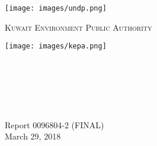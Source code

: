 \documentclass[
12pt, %
oneside, %
english, %
singlespacing, %
nolistspacing, %
liststotoc, %
parskip, %
headsepline, %
chapterinoneline, %
]{MastersDoctoralThesis} %
\author{Brian Freeman, PE} %
\begin{document}
\frontmatter %

\pagestyle{plain} %


\begin{titlepage}
\begin{center}

\vspace*{.02\textheight}
{\scshape\LARGE \univname\par} %
\begin{center}
\texttt{[image: images/undp.png]} %
\end{center}
\textsc{\LARGE Kuwait Environment Public Authority}\\[0.5cm] 
\begin{center}
\texttt{[image: images/kepa.png]} %
\end{center}
\HRule \\[0.4cm] %
{\huge \bfseries \ttitle\par}\vspace{0.4cm} %
\HRule \\[1.5cm] %
\begin{minipage}[t]{0.4\textwidth}
\begin{flushleft} \large
\end{flushleft}
\end{minipage}
\begin{minipage}[t]{0.4\textwidth}
\begin{flushright} \large

\end{flushright}
\end{minipage}\\[1cm]
 
\vfill

 Report 0096804-2 (FINAL)\\
 
\vfill
{\large March 29, 2018}\\[2cm] %
\vfill
\end{center}
\end{titlepage}
\end{document}
